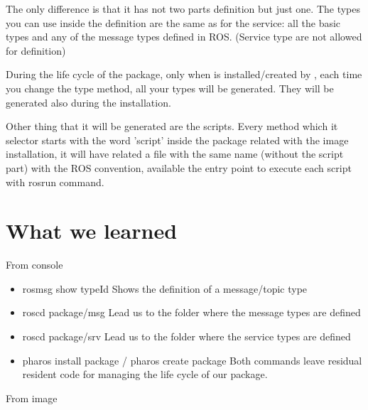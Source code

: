 \documentclass[a4paper,10pt,twoside]{book}
\begin{document}
			The only difference is that it has not two parts definition but just one. 
			The types you can use inside the definition are the same as for the service: all the basic types and any of the message types defined in ROS. (Service type are not allowed for definition)
			
			
			During the life cycle of the package, only when is installed/created by \installationTool{}, each time you change the type method, all your types will be generated. They will be generated also during the installation.
			
			Other thing that it will be generated are the scripts. Every method which it selector starts with the word 'script' inside the package related with the image installation, it will have related a file with the same name (without the script part) with the ROS convention, available the entry point to execute each script with rosrun command. 
			
			
			
			\section{What we learned }
			
			
				From console
				
				\begin{itemize}
					\item rosmsg show typeId
						\newline \-\- Shows the definition of a message/topic type
					\item roscd package/msg
						\newline \-\- Lead us to the folder where the message types are defined
					\item roscd package/srv
						\newline \-\- Lead us to the folder where the service types are defined
					\item pharos install package / pharos create package
						\newline \-\- Both commands leave residual resident code for managing the life cycle of our package.
				\end{itemize}
				
				
				From image 
				
\end{document}
